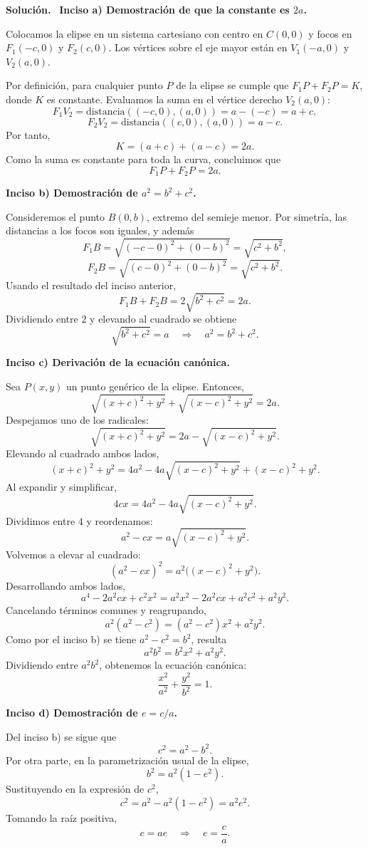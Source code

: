 \documentclass[11pt]{article}
\theoremstyle{prismstyle}
\newenvironment{solution}[1][Solución]
  {\par\textbf{#1.}\ }
  {\par}
\begin{document}
\begin{solution}
\textbf{Inciso a) Demostración de que la constante es $2a$.}

Colocamos la elipse en un sistema cartesiano con centro en $C(0,0)$ y focos en $F_1(-c,0)$ y $F_2(c,0)$. Los vértices sobre el eje mayor están en $V_1(-a,0)$ y $V_2(a,0)$.

Por definición, para cualquier punto $P$ de la elipse se cumple que $F_1P + F_2P = K$, donde $K$ es constante. Evaluamos la suma en el vértice derecho $V_2(a,0)$:
\[
F_1V_2 = \text{distancia}((-c,0),(a,0)) = a-(-c) = a+c,
\]
\[
F_2V_2 = \text{distancia}((c,0),(a,0)) = a-c.
\]
Por tanto,
\[
K = (a+c) + (a-c) = 2a.
\]
Como la suma es constante para toda la curva, concluimos que
\[
\boxed{F_1P + F_2P = 2a}.
\]

\textbf{Inciso b) Demostración de $a^2 = b^2 + c^2$.}

Consideremos el punto $B(0,b)$, extremo del semieje menor. Por simetría, las distancias a los focos son iguales, y además
\[
F_1B = \sqrt{(-c-0)^2 + (0-b)^2} = \sqrt{c^2+b^2},
\]
\[
F_2B = \sqrt{(c-0)^2 + (0-b)^2} = \sqrt{c^2+b^2}.
\]
Usando el resultado del inciso anterior,
\[
F_1B + F_2B = 2\sqrt{b^2+c^2} = 2a.
\]
Dividiendo entre $2$ y elevando al cuadrado se obtiene
\[
\sqrt{b^2+c^2} = a \quad \Rightarrow \quad \boxed{a^2 = b^2+c^2}.
\]

\textbf{Inciso c) Derivación de la ecuación canónica.}

Sea $P(x,y)$ un punto genérico de la elipse. Entonces,
\[
\sqrt{(x+c)^2 + y^2} + \sqrt{(x-c)^2 + y^2} = 2a.
\]
Despejamos uno de los radicales:
\[
\sqrt{(x+c)^2 + y^2} = 2a - \sqrt{(x-c)^2 + y^2}.
\]
Elevando al cuadrado ambos lados,
\[
(x+c)^2 + y^2 = 4a^2 - 4a\sqrt{(x-c)^2 + y^2} + (x-c)^2 + y^2.
\]
Al expandir y simplificar,
\[
4cx = 4a^2 - 4a\sqrt{(x-c)^2 + y^2}.
\]
Dividimos entre $4$ y reordenamos:
\[
a^2 - cx = a\sqrt{(x-c)^2 + y^2}.
\]
Volvemos a elevar al cuadrado:
\[
(a^2-cx)^2 = a^2\bigl((x-c)^2+y^2\bigr).
\]
Desarrollando ambos lados,
\[
a^4 - 2a^2cx + c^2x^2 = a^2x^2 - 2a^2cx + a^2c^2 + a^2y^2.
\]
Cancelando términos comunes y reagrupando,
\[
a^2(a^2-c^2) = (a^2-c^2)x^2 + a^2y^2.
\]
Como por el inciso b) se tiene $a^2-c^2=b^2$, resulta
\[
a^2b^2 = b^2x^2 + a^2y^2.
\]
Dividiendo entre $a^2b^2$, obtenemos la ecuación canónica:
\[
\boxed{\frac{x^2}{a^2} + \frac{y^2}{b^2} = 1}.
\]

\textbf{Inciso d) Demostración de $e = c/a$.}

Del inciso b) se sigue que
\[
c^2 = a^2-b^2.
\]
Por otra parte, en la parametrización usual de la elipse,
\[
b^2 = a^2(1-e^2).
\]
Sustituyendo en la expresión de $c^2$,
\[
c^2 = a^2 - a^2(1-e^2) = a^2e^2.
\]
Tomando la raíz positiva,
\[
c = ae \quad \Rightarrow \quad \boxed{e = \frac{c}{a}}.
\]


\end{solution}
\end{document}
